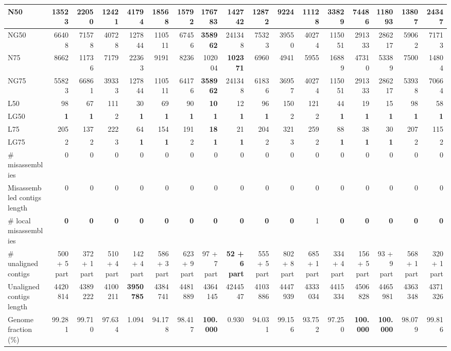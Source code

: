 \documentclass[12pt,a4paper]{article}
\begin{document}
\begin{table}[ht]
\begin{center}
\begin{tabular}{|l*{16}{|r}|}
N50 & 13523 & 22050 & 12421 & 41794 & 18568 & 15792 & {\bf 176783} & 142742 & 12872 & 9224 & 11128 & 33829 & 74486 & 118093 & 13807 & 24347 \\ \hline
NG50 & 66408 & 71578 & 40728 & 127844 & 110511 & 67456 & {\bf 358962} & 241348 & 75323 & 39550 & 40274 & 115051 & 291333 & 286217 & 59062 & 71713 \\ \hline
N75 & 8662 & 11736 & 7179 & 22363 & 9191 & 8236 & 102004 & {\bf 102371} & 6960 & 4941 & 5955 & 16889 & 47310 & 53389 & 7500 & 14804 \\ \hline
NG75 & 55823 & 66861 & 39333 & 127844 & 110511 & 64176 & {\bf 358962} & 241348 & 61836 & 36957 & 40274 & 115051 & 291333 & 286217 & 53938 & 70664 \\ \hline
L50 & 98 & 67 & 111 & 30 & 69 & 90 & {\bf 10} & 12 & 96 & 150 & 121 & 44 & 19 & 15 & 98 & 58 \\ \hline
LG50 & {\bf 1} & {\bf 1} & 2 & {\bf 1} & {\bf 1} & {\bf 1} & {\bf 1} & {\bf 1} & {\bf 1} & 2 & 2 & {\bf 1} & {\bf 1} & {\bf 1} & {\bf 1} & {\bf 1} \\ \hline
L75 & 205 & 137 & 222 & 64 & 154 & 191 & {\bf 18} & 21 & 204 & 321 & 259 & 88 & 38 & 30 & 207 & 115 \\ \hline
LG75 & 2 & 2 & 3 & {\bf 1} & {\bf 1} & 2 & {\bf 1} & {\bf 1} & 2 & 3 & 2 & {\bf 1} & {\bf 1} & {\bf 1} & 2 & 2 \\ \hline
\# misassemblies & 0 & 0 & 0 & 0 & 0 & 0 & 0 & 0 & 0 & 0 & 0 & 0 & 0 & 0 & 0 & 0 \\ \hline
Misassembled contigs length & 0 & 0 & 0 & 0 & 0 & 0 & 0 & 0 & 0 & 0 & 0 & 0 & 0 & 0 & 0 & 0 \\ \hline
\# local misassemblies & {\bf 0} & {\bf 0} & {\bf 0} & {\bf 0} & {\bf 0} & {\bf 0} & {\bf 0} & {\bf 0} & {\bf 0} & {\bf 0} & 1 & {\bf 0} & {\bf 0} & {\bf 0} & {\bf 0} & {\bf 0} \\ \hline
\# unaligned contigs & 500 + 5 part & 372 + 1 part & 510 + 4 part & 142 + 4 part & 586 + 3 part & 623 + 9 part & 97 + 7 part & {\bf 52 + 6 part} & 555 + 5 part & 802 + 8 part & 685 + 1 part & 334 + 4 part & 156 + 5 part & 93 + 9 part & 568 + 1 part & 320 + 1 part \\ \hline
Unaligned contigs length & 4420814 & 4389222 & 4100211 & {\bf 3950785} & 4384741 & 4481889 & 4364145 & 4244547 & 4103886 & 4447939 & 4333034 & 4415334 & 4506828 & 4465981 & 4363348 & 4371326 \\ \hline
Genome fraction (\%) & 99.281 & 99.710 & 97.634 & 1.094 & 94.178 & 98.417 & {\bf 100.000} & 0.930 & 94.031 & 99.156 & 93.752 & 97.250 & {\bf 100.000} & {\bf 100.000} & 98.079 & 99.816 \\ \hline

\end{tabular}
\end{center}
\end{table}
\end{document}
